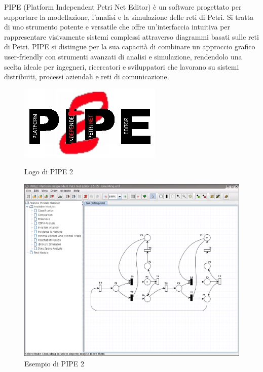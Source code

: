 PIPE (Platform Independent Petri Net Editor) è un software progettato per supportare la modellazione, l'analisi e la simulazione delle reti di Petri. Si tratta di uno strumento potente e versatile che offre un'interfaccia intuitiva per rappresentare visivamente sistemi complessi attraverso diagrammi basati sulle reti di Petri. PIPE si distingue per la sua capacità di combinare un approccio grafico user-friendly con strumenti avanzati di analisi e simulazione, rendendolo una scelta ideale per ingegneri, ricercatori e sviluppatori che lavorano su sistemi distribuiti, processi aziendali e reti di comunicazione.

\begin{figure}
    \centering
    \begin{minipage}[b]{.45\textwidth}
        \centering
        \includegraphics[width=\textwidth]{figure/pipe/pipe_logo.png}
        \caption{Logo di PIPE 2}
        \label{fig:pipe_logo}
    \end{minipage}
    \hfill
    \begin{minipage}[b]{.45\textwidth}
        \centering
        \includegraphics[width=\textwidth]{figure/pipe/pipe_example.png}
        \caption{Esempio di PIPE 2}
        \label{fig:pipe_example}
    \end{minipage}
\end{figure}

